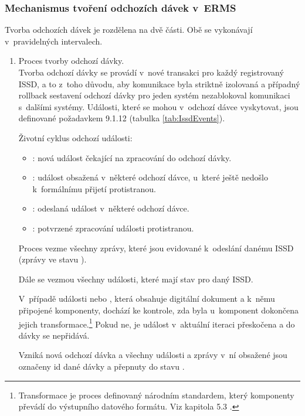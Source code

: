 \documentclass[
  master,
  field=ainfp,
  biblatex,
  language=czech,
  glossaries,
  theorems=false,
  index
]{kidiplom}
\begin{document}
\subsubsection{Mechanismus tvoření odchozích dávek v~ERMS}
Tvorba odchozích dávek je rozdělena na dvě části. Obě se vykonávají v~pravidelných intervalech.
\begin{enumerate}
	\item Proces tvorby odchozí dávky.\\
	Tvorba odchozí dávky se provádí v~nové transakci pro každý registrovaný ISSD, a to z~toho důvodu, aby komunikace byla striktně izolovaná a případný rollback sestavení odchozí dávky pro jeden systém nezablokoval komunikaci s~dalšími systémy. Události, které se mohou v~odchozí dávce vyskytovat, jsou definované požadavkem 9.1.12 \cite[s.~63]{o00} (tabulka \ref{tab:IssdEvents}).
	
	Životní cyklus odchozí události:
\begin{itemize}
	\item {}: nová událost čekající na zpracování do odchozí dávky.
	\item {}: událost obsažená v~některé odchozí dávce, u~které ještě nedošlo k~formálnímu přijetí protistranou.
	\item {}: odeslaná událost v~některé odchozí dávce.
	\item {}: potvrzené zpracování události protistranou.    
\end{itemize}
	
	Proces vezme všechny zprávy, které jsou evidované k~odeslání danému ISSD (zprávy ve stavu ).
	
	Dále se vezmou všechny události, které mají stav  pro daný ISSD.
	
	V~případě události  nebo , která obsahuje digitální dokument a k~němu připojené komponenty, dochází ke kontrole, zda byla u~komponent dokončena jejich transformace.\footnote{Transformace je proces definovaný národním standardem, který komponenty převádí do výstupního datového formátu. Viz kapitola 5.3 \cite[s.~39]{o00}.} Pokud ne, je událost v~aktuální iteraci přeskočena a do dávky se nepřidává.
	
	Vzniká nová odchozí dávka a všechny události a zprávy v~ní obsažené jsou označeny id dané dávky a přepnuty do stavu .


\end{enumerate}
\end{document}
